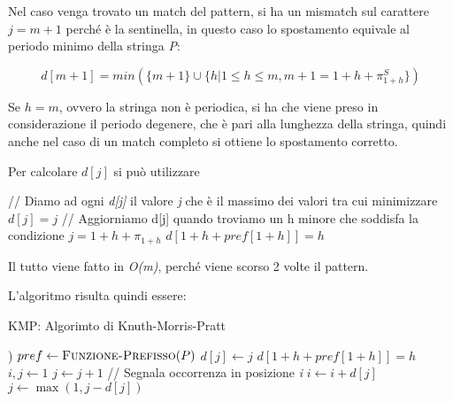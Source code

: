 Nel caso venga trovato un match del pattern, si ha un mismatch sul
carattere $j=m+1$ perché è la sentinella, in questo caso lo
spostamento equivale al periodo minimo della stringa \emph{P}:

$$
d[m+1] = min(\{m+1\} \cup \{h | 1 \leq h \leq m, m+1 = 1 + h + \pi_{1+h}^S\})
$$

Se $h = m$, ovvero la stringa non è periodica, si ha che viene
preso in considerazione il periodo degenere, che è pari alla lunghezza
della stringa, quindi anche nel caso di un match completo si ottiene lo
spostamento corretto.

Per calcolare $d[j]$ si può utilizzare

\begin{breakablealgorithm}
	\begin{algorithmic}[1]
			\State // Diamo ad ogni \textit{d[j]} il valore \textit{j} che è il massimo dei valori tra cui minimizzare
			\State $ d[j] = j $
		\EndFor
			\State // Aggiorniamo d[j] quando troviamo un h minore che soddisfa la condizione $j = 1 + h + \pi_{1+h} $
			\State $ d[1 + h + pref[1+h]] = h $
	    \EndFor
	\end{algorithmic}
\end{breakablealgorithm}

Il tutto viene fatto in \emph{O(m)}, perché viene scorso 2 volte il
pattern.

L'algoritmo risulta quindi essere:

\begin{breakablealgorithm}
	\caption{KMP: Algorimto di Knuth-Morris-Pratt}
	\begin{algorithmic}[1]
	)
    \State $ pref \gets \text{\textsc{Funzione-Prefisso}}(P) $
		\State $ d[j] \gets j $
	\EndFor
	    \State $ d[1 + h + pref[1+h]] = h $
    \EndFor
	\State $ i,j \gets 1 $
            \State $ j \gets j + 1 $
        \EndWhile
            \State// Segnala occorrenza in posizione \textit{i}
        \EndIf
        \State $ i \gets i + d[j] $ 
        \State $ j \gets \max(1, j - d[j]) $ 
	 \EndWhile
	 \EndFunction
	\end{algorithmic}
\end{breakablealgorithm}

